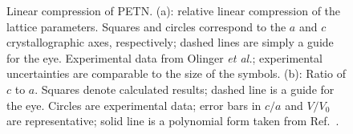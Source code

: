 \documentclass[prb,aps,nobibnotes,twocolumn,doublespace,twocolumngrid,superbib]{revtex4}
\begin{document}
\begin{figure}
\caption{Linear compression of PETN.  (a): relative linear compression
of the lattice parameters. Squares and circles correspond to the $a$ and $c$ 
crystallographic axes, respectively; dashed lines are simply a guide for
the eye.  Experimental data from Olinger {\it et al.}\cite{Olinger_1975v62}; 
experimental uncertainties
are comparable to the size of the symbols. (b): Ratio of $c$ to $a$.
Squares denote calculated results;
dashed line is a guide for the eye.  Circles are experimental 
data\cite{Olinger_1975v62};
error bars in $c/a$ and $V/V_0$ are representative; solid line is a 
polynomial form taken from Ref.~\cite{Olinger_1975v62}.
}
\label{fig:linear_compress}
\end{figure}

\end{document}
